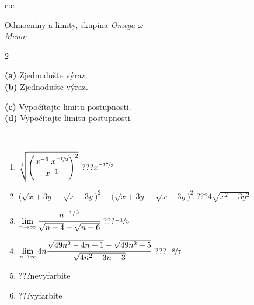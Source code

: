 \documentclass[10pt]{report}
\begin{document}
\begin{tabular}{c:c}
\begin{minipage}[c][104.5mm][t]{0.5\linewidth}
\begin{center}
\vspace{7mm}
{\huge Odmocniny a limity, skupina \textit{Omega $\omega$} -}\\[5mm]
\textit{Meno:}\phantom{xxxxxxxxxxxxxxxxxxxxxxxxxxxxxxxxxxxxxxxxxxxxxxxxxxxxxxxxxxxxxxxxx}\\[5mm]
\begin{minipage}{0.95\linewidth}
\begin{center}
{\small \begin{multicols}{2} \raggedright
\textbf{(a)} Zjednodušte výraz. \\[1mm]
\textbf{(b)} Zjednodušte výraz. \par \columnbreak
\textbf{(c)} Vypočítajte limitu postupnosti. \\[1mm]
\textbf{(d)} Vypočítajte limitu postupnosti.
\end{multicols}
}
\end{center}
\end{minipage}
\\[4mm]
\begin{minipage}{0.79\linewidth}
\begin{center}
\begin{varwidth}{\linewidth}
\begin{enumerate}
\small
\item $\sqrt[3]{\left(\cfrac{x^{-6}\;x^{\nicefrac{-7}{2}}}{x^{-1}}\right)^{2}}$\quad \dotfill\; ???\;\dotfill \quad $x^{\nicefrac{-17}{3}}$
\item {\footnotesize{\scriptsize$\big(\sqrt{x+3y}+\sqrt{x-3y}\big)^2-\big(\sqrt{x+3y}-\sqrt{x-3y}\big)^2$}\quad \dotfill\; ???\;\dotfill \quad $4\sqrt{x^2-3y^2}$}
\item $\lim\limits_{n\to\infty}\cfrac{n^{-1/2}}{\sqrt{n-4}-\sqrt{n+6}}$\quad \dotfill\; ???\;\dotfill \quad $\nicefrac{-1}{5}$
\item $\lim\limits_{n\to\infty}4n\cfrac{\sqrt{49n^2-4n+1}-\sqrt{49n^2+5}}{\sqrt{4n^2-3n-3}}$\quad \dotfill\; ???\;\dotfill \quad $\nicefrac{-8}{7}$
\item \quad \dotfill\; ???\;\dotfill \quad nevyfarbite
\item \quad \dotfill\; ???\;\dotfill \quad vyfarbite
\end{enumerate}
\end{varwidth}
\end{center}

\end{minipage}
\end{center}
\end{minipage}
\end{tabular}
\end{document}
